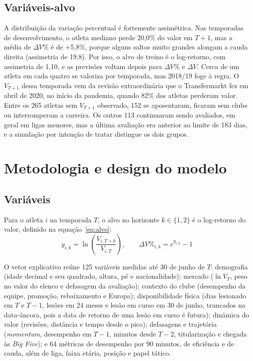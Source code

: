 \documentclass[article, 12pt, oneside, a4paper, english, brazil, section=TITLE]{abntex2}
\begin{document}
\subsection{Variáveis-alvo}

A distribuição da variação percentual é fortemente assimétrica.
Nas temporadas de desenvolvimento, o atleta mediano perde 20,0\% do valor em $T+1$, mas a média de $\Delta V\%$ é de +5,8\%, porque alguns saltos muito grandes alongam a cauda direita (assimetria de 19,8).
Por isso, o alvo de treino é o log-retorno, com assimetria de 1,10, e as previsões voltam depois para $\Delta V\%$ e $\Delta V$.
Cerca de um atleta em cada quatro se valoriza por temporada, mas 2018/19 foge à regra.
O $V_{T+1}$ dessa temporada vem da revisão extraordinária que o Transfermarkt fez em abril de 2020, no início da pandemia, quando 82\% dos atletas perderam valor.
Entre os 265 atletas sem $V_{T+1}$ observado, 152 se aposentaram, ficaram sem clube ou interromperam a carreira.
Os outros 113 continuaram sendo avaliados, em geral em ligas menores, mas a última avaliação era anterior ao limite de 183 dias, e a simulação por intenção de tratar distingue os dois grupos.

\section{Metodologia e design do modelo}\label{sec:metodo}

\subsection{Variáveis}

Para o atleta $i$ na temporada $T$, o alvo no horizonte $k \in \{1, 2\}$ é o log-retorno do valor, definido na equação~\eqref{eq:alvo}:
\begin{equation}
  y_{i,k} = \ln\left(\frac{V_{i,T+k}}{V_{i,T}}\right), \qquad \Delta V\%_{i,k} = e^{y_{i,k}} - 1
  \label{eq:alvo}
\end{equation}

O vetor explicativo reúne 125 variáveis medidas até 30 de junho de $T$: demografia (idade decimal e seu quadrado, altura, pé e nacionalidade); mercado ($\ln V_T$, peso no valor do elenco e defasagem da avaliação); contexto do clube (desempenho da equipe, promoção, rebaixamento e Europa); disponibilidade física (dias lesionado em $T$ e $T-1$, lesões em 24 meses e lesão em curso em 30 de junho, truncados na data-âncora, pois a data de retorno de uma lesão em curso é futura); dinâmica do valor (revisões, distância e tempo desde o pico); defasagens e trajetória (\textit{momentum}, desempenho em $T-1$, minutos desde $T-2$, titularização e chegada às \textit{Big Five}); e 64 métricas de desempenho por 90 minutos, de eficiência e de cauda, além de liga, faixa etária, posição e papel tático.
\end{document}
